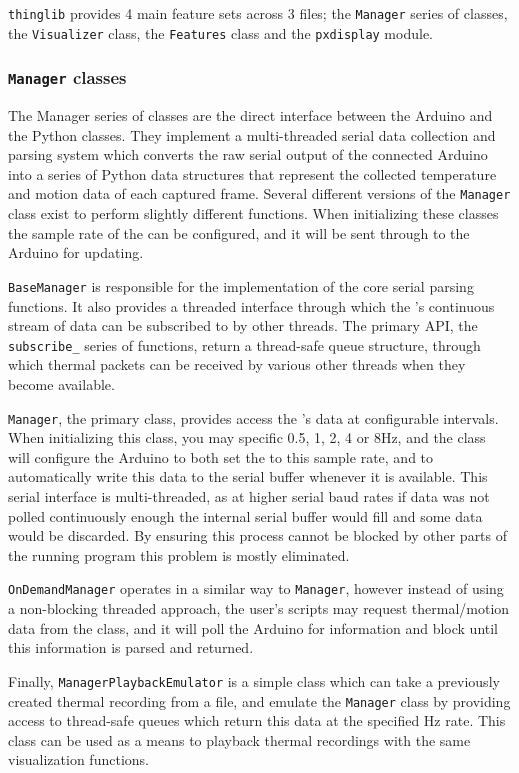 \documentclass[../thesis/thesis.tex]{subfiles}
\begin{document}
\texttt{thinglib} provides 4 main feature sets across 3 files; the \texttt{Manager} series of classes, the \texttt{Visualizer} class, the \texttt{Features} class and the \texttt{pxdisplay} module.

\subsubsection*{\texttt{Manager} classes}
The Manager series of classes are the direct interface between the Arduino and the Python classes. They implement a multi-threaded serial data collection and parsing system which converts the raw serial output of the connected Arduino into a series of Python data structures that represent the collected temperature and motion data of each captured frame. Several different versions of the \texttt{Manager} class exist to perform slightly different functions. When initializing these classes the sample rate of the \mlx can be configured, and it will be sent through to the Arduino for updating.

\texttt{BaseManager} is responsible for the implementation of the core serial parsing functions. It also provides a threaded interface through which the \mlx's continuous stream of data can be subscribed to by other threads. The primary API, the \texttt{subscribe\_} series of functions, return a thread-safe queue structure, through which thermal packets can be received by various other threads when they become available.

\texttt{Manager}, the primary class, provides access the \mlx's data at configurable intervals. When initializing this class, you may specific 0.5, 1, 2, 4 or 8Hz, and the class will configure the Arduino to both set the \mlx to this sample rate, and to automatically write this data to the serial buffer whenever it is available. This serial interface is multi-threaded, as at higher serial baud rates if data was not polled continuously enough the internal serial buffer would fill and some data would be discarded. By ensuring this process cannot be blocked by other parts of the running program this problem is mostly eliminated. 

\texttt{OnDemandManager} operates in a similar way to \texttt{Manager}, however instead of using a non-blocking threaded approach, the user's scripts may request thermal/motion data from the class, and it will poll the Arduino for information and block until this information is parsed and returned.

Finally, \texttt{ManagerPlaybackEmulator} is a simple class which can take a previously created thermal recording from a file, and emulate the \texttt{Manager} class by providing access to thread-safe queues which return this data at the specified Hz rate. This class can be used as a means to playback thermal recordings with the same visualization functions.
\end{document}
